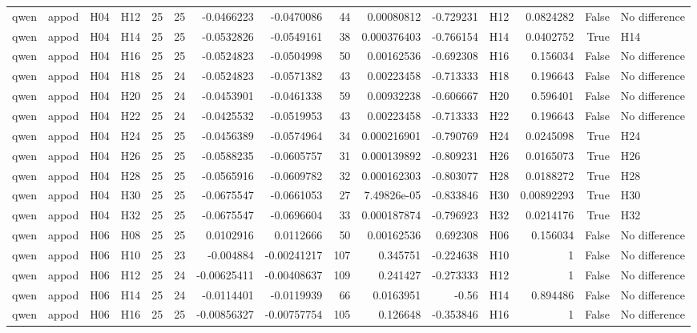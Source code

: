 \begin{longtable}{llllrrrrrrrlrrl}
qwen & appod & H04 & H12 & 25 & 25 & -0.0466223 & -0.0470086 & 44 & 0.00080812 & -0.729231 & H12 & 0.0824282 & False & No difference \\
qwen & appod & H04 & H14 & 25 & 25 & -0.0532826 & -0.0549161 & 38 & 0.000376403 & -0.766154 & H14 & 0.0402752 & True & H14 \\
qwen & appod & H04 & H16 & 25 & 25 & -0.0524823 & -0.0504998 & 50 & 0.00162536 & -0.692308 & H16 & 0.156034 & False & No difference \\
qwen & appod & H04 & H18 & 25 & 24 & -0.0524823 & -0.0571382 & 43 & 0.00223458 & -0.713333 & H18 & 0.196643 & False & No difference \\
qwen & appod & H04 & H20 & 25 & 24 & -0.0453901 & -0.0461338 & 59 & 0.00932238 & -0.606667 & H20 & 0.596401 & False & No difference \\
qwen & appod & H04 & H22 & 25 & 24 & -0.0425532 & -0.0519953 & 43 & 0.00223458 & -0.713333 & H22 & 0.196643 & False & No difference \\
qwen & appod & H04 & H24 & 25 & 25 & -0.0456389 & -0.0574964 & 34 & 0.000216901 & -0.790769 & H24 & 0.0245098 & True & H24 \\
qwen & appod & H04 & H26 & 25 & 25 & -0.0588235 & -0.0605757 & 31 & 0.000139892 & -0.809231 & H26 & 0.0165073 & True & H26 \\
qwen & appod & H04 & H28 & 25 & 25 & -0.0565916 & -0.0609782 & 32 & 0.000162303 & -0.803077 & H28 & 0.0188272 & True & H28 \\
qwen & appod & H04 & H30 & 25 & 25 & -0.0675547 & -0.0661053 & 27 & 7.49826e-05 & -0.833846 & H30 & 0.00892293 & True & H30 \\
qwen & appod & H04 & H32 & 25 & 25 & -0.0675547 & -0.0696604 & 33 & 0.000187874 & -0.796923 & H32 & 0.0214176 & True & H32 \\
qwen & appod & H06 & H08 & 25 & 25 & 0.0102916 & 0.0112666 & 50 & 0.00162536 & 0.692308 & H06 & 0.156034 & False & No difference \\
qwen & appod & H06 & H10 & 25 & 23 & -0.004884 & -0.00241217 & 107 & 0.345751 & -0.224638 & H10 & 1 & False & No difference \\
qwen & appod & H06 & H12 & 25 & 24 & -0.00625411 & -0.00408637 & 109 & 0.241427 & -0.273333 & H12 & 1 & False & No difference \\
qwen & appod & H06 & H14 & 25 & 24 & -0.0114401 & -0.0119939 & 66 & 0.0163951 & -0.56 & H14 & 0.894486 & False & No difference \\
qwen & appod & H06 & H16 & 25 & 25 & -0.00856327 & -0.00757754 & 105 & 0.126648 & -0.353846 & H16 & 1 & False & No difference \\

\end{longtable}
